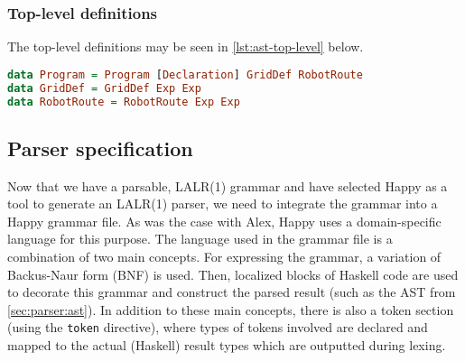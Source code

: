 \subsubsection{Top-level definitions}
The top-level definitions may be seen in \cref{lst:ast-top-level} below.
\begin{lstlisting}[language=haskell, float=htb,
caption={\lstinline{Program}, \lstinline{GridDef} and \lstinline{RobotRoute} data types (AST)},
label=lst:ast-top-level]
data Program = Program [Declaration] GridDef RobotRoute
data GridDef = GridDef Exp Exp
data RobotRoute = RobotRoute Exp Exp
\end{lstlisting}

\subsection{Parser specification}
Now that we have a parsable, LALR(1) grammar and have selected Happy as a tool to generate an LALR(1) parser, we need to integrate the grammar into a Happy grammar file. As was the case with Alex, Happy uses a domain-specific language for this purpose. The language used in the grammar file is a combination of two main concepts. For expressing the grammar, a variation of Backus-Naur form (BNF) is used. Then, localized blocks of Haskell code are used to decorate this grammar and construct the parsed result (such as the AST from \cref{sec:parser:ast}). In addition to these main concepts, there is also a token section (using the \lstinline{token} directive), where types of tokens involved are declared and mapped to the actual (Haskell) result types which are outputted during lexing.\cite{happyUserGuide}

